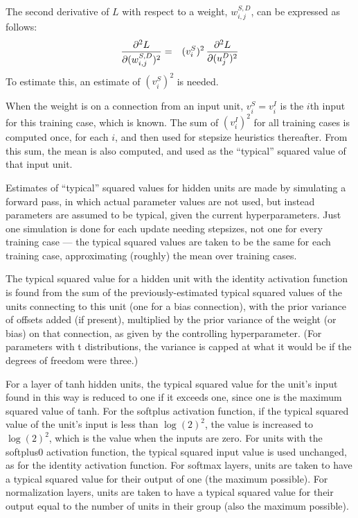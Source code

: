 \documentclass{report}[11pt]
\def\beq{\begin{eqnarray}}
\def\eeq{\end{eqnarray}}
\begin{document}
The second derivative of $L$ with respect to a weight, $w^{S,D}_{i,j}$,
can be expressed as follows:\beq
  {\partial^2 L \over \partial (w^{S,D}_{i,j})^2} & = &
    (v^S_i)^2\,{\partial^2 L \over \partial (u^D_j)^2}
\eeq%
To estimate this, an estimate of $(v^S_i)^2$ is needed.

When the weight is on a connection from an input unit, $v^S_i = v^I_i$
is the $i$th input for this training case, which is known.  The sum of
$(v^I_i)^2$ for all training cases is computed once, for each $i$, and
then used for stepsize heuristics thereafter.  From this sum, the
mean is also computed, and used as the ``typical'' squared value of
that input unit.

Estimates of ``typical'' squared values for hidden units are made by
simulating a forward pass, in which actual parameter values are not
used, but instead parameters are assumed to be typical, given the
current hyperparameters.  Just one simulation is done for each update
needing stepsizes, not one for every training case --- the typical
squared values are taken to be the same for each training case,
approximating (roughly) the mean over training cases.

The typical squared value for a hidden unit with the identity
activation function is found from the sum of the previously-estimated
typical squared values of the units connecting to this unit (one for a
bias connection), with the prior variance of offsets added (if
present), multiplied by the prior variance of the weight (or bias) on
that connection, as given by the controlling hyperparameter.  (For
parameters with t distributions, the variance is capped at what it
would be if the degrees of freedom were three.)

For a layer of tanh hidden units, the typical squared value for the
unit's input found in this way is reduced to one if it exceeds one,
since one is the maximum squared value of tanh.  For the softplus
activation function, if the typical squared value of the unit's input
is less than $\log(2)^2$, the value is increased to $\log(2)^2$, which
is the value when the inputs are zero. For units with the softplus0
activation function, the typical squared input value is used
unchanged, as for the identity activation function.  For softmax
layers, units are taken to have a typical squared value for their
output of one (the maximum possible).  For normalization layers, units
are taken to have a typical squared value for their output equal to
the number of units in their group (also the maximum possible).
\end{document}
